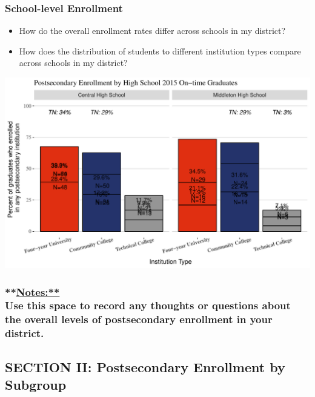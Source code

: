 \documentclass[11pt,]{article}
\providecommand{\tightlist}{%
  \setlength{\itemsep}{0pt}\setlength{\parskip}{0pt}}
\begin{document}
\newpage

\subsubsection{School-level Enrollment}\label{school-level-enrollment}

\begin{itemize}
\tightlist
\item
  How do the overall enrollment rates differ across schools in my
  district?
\item
  How does the distribution of students to different institution types
  compare across schools in my district?
\end{itemize}

\includegraphics{20170517_PSWRR_files/figure-latex/Enrollment by School-1.pdf}

\subsubsection{\texorpdfstring{**\url{Notes:**}\\
Use this space to record any thoughts or questions about the overall
levels of postsecondary enrollment in your
district.}{**Notes:** Use this space to record any thoughts or questions about the overall levels of postsecondary enrollment in your district.}}\label{notes-use-this-space-to-record-any-thoughts-or-questions-about-the-overall-levels-of-postsecondary-enrollment-in-your-district.}

\newpage 

\subsection{SECTION II: Postsecondary Enrollment by
Subgroup}\label{section-ii-postsecondary-enrollment-by-subgroup}
\end{document}

